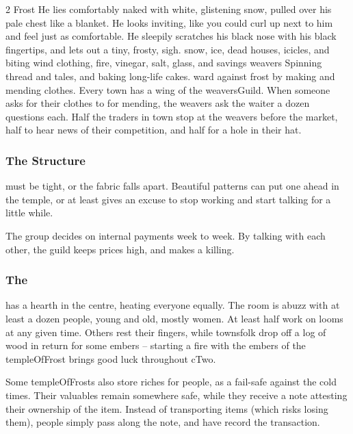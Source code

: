 \begin{multicols}{2}
  {Frost}%
  {
    He lies comfortably naked with white, glistening snow, pulled over his pale chest like a blanket.
    He looks inviting, like you could curl up next to him and feel just as comfortable.
    He sleepily scratches his black nose with his black fingertips, and lets out a tiny, frosty, {\sffamily sigh}.
  }%
  {snow, ice, dead houses, icicles, and biting wind}%
  {clothing, fire, vinegar, salt, glass, and savings}%
  {\Glspl{weaver}}%
  {
    Spinning thread and tales, and baking long-life cakes.
  }%
ward against frost by making and mending clothes.
Every town has a wing of the \gls{weaversGuild}.
When someone asks for their clothes to for mending, the weavers ask the waiter a dozen questions each.
Half the traders in town stop at the weavers before the market, half to hear news of their competition, and half for a hole in their hat.

\subsubsection{The Structure}
must be tight, or the fabric falls apart.
Beautiful patterns can put one ahead in the temple, or at least gives an excuse to stop working and start talking for a little while.

The group decides on internal payments week to week.
By talking with each other, the guild keeps prices high, and makes a killing.

\subsubsection{The }
has a hearth in the centre, heating everyone equally.
The room is abuzz with at least a dozen people, young and old, mostly women.
At least half work on looms at any given time.
Others rest their fingers, while townsfolk drop off a log of wood in return for some embers -- starting a fire with the embers of the \gls{templeOfFrost} brings good luck throughout \gls{cTwo}.


Some \glspl{templeOfFrost} also store riches for people, as a fail-safe against the cold times.
Their valuables remain somewhere safe, while they receive a note attesting their ownership of the item.
Instead of transporting items (which risks losing them), people simply pass along the note, and have  record the transaction.


\end{multicols}
